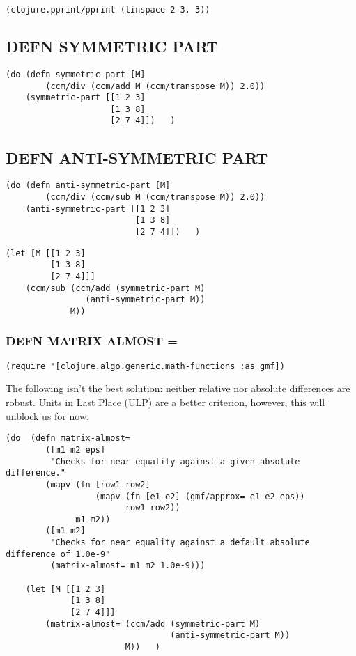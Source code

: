 \documentclass[10pt,oneside,x11names]{article}
\begin{document}
\begin{verbatim}
(clojure.pprint/pprint (linspace 2 3. 3))
\end{verbatim}

\subsection{DEFN SYMMETRIC PART}
\label{sec:org6b72186}

\begin{verbatim}
(do (defn symmetric-part [M]
        (ccm/div (ccm/add M (ccm/transpose M)) 2.0))
    (symmetric-part [[1 2 3]
                     [1 3 8]
                     [2 7 4]])   )
\end{verbatim}

\subsection{DEFN ANTI-SYMMETRIC PART}
\label{sec:org19f56fd}

\begin{verbatim}
(do (defn anti-symmetric-part [M]
        (ccm/div (ccm/sub M (ccm/transpose M)) 2.0))
    (anti-symmetric-part [[1 2 3]
                          [1 3 8]
                          [2 7 4]])   )
\end{verbatim}

\begin{verbatim}
(let [M [[1 2 3]
         [1 3 8]
         [2 7 4]]]
    (ccm/sub (ccm/add (symmetric-part M)
                (anti-symmetric-part M))
             M))
\end{verbatim}

\subsubsection{DEFN MATRIX ALMOST =}
\label{near-equality-for-matrices}
\begin{verbatim}
(require '[clojure.algo.generic.math-functions :as gmf])
\end{verbatim}

The following isn't the best solution: neither relative nor absolute differences
are robust. Units in Last Place (ULP) are a better criterion, however, this will
unblock us for now.

\begin{verbatim}
(do  (defn matrix-almost=
        ([m1 m2 eps]
         "Checks for near equality against a given absolute difference."
        (mapv (fn [row1 row2]
                  (mapv (fn [e1 e2] (gmf/approx= e1 e2 eps))
                        row1 row2))
              m1 m2))
        ([m1 m2]
         "Checks for near equality against a default absolute difference of 1.0e-9"
         (matrix-almost= m1 m2 1.0e-9)))

    (let [M [[1 2 3]
             [1 3 8]
             [2 7 4]]]
        (matrix-almost= (ccm/add (symmetric-part M)
                                 (anti-symmetric-part M))
                        M))   )
\end{verbatim}
\end{document}
